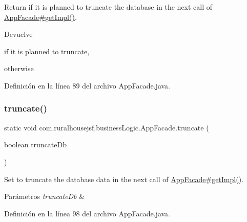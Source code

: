 Return if it is planned to truncate the database in the next call of \mbox{\hyperlink{classcom_1_1ruralhousejsf_1_1business_logic_1_1_app_facade_a029bcceee98b9070b9f80abc54db45d6}{App\+Facade\#get\+Impl()}}.

\begin{DoxyReturn}{Devuelve}

\begin{DoxyCode}{0}
\DoxyCodeLine{\textcolor{keyword}{true} }
\end{DoxyCode}
 if it is planned to truncate,
\begin{DoxyCode}{0}
\DoxyCodeLine{\textcolor{keyword}{false} }
\end{DoxyCode}
 otherwise 
\end{DoxyReturn}


Definición en la línea 89 del archivo App\+Facade.\+java.

\mbox{\label{classcom_1_1ruralhousejsf_1_1business_logic_1_1_app_facade_a98aed1ed8a03c6a92e15121fed4eb452}} 
\subsubsection{\texorpdfstring{truncate()}{truncate()}}
{\footnotesize\ttfamily static void com.\+ruralhousejsf.\+business\+Logic.\+App\+Facade.\+truncate (\begin{DoxyParamCaption}\item[{boolean}]{truncate\+Db }\end{DoxyParamCaption})\hspace{0.3cm}{\ttfamily [static]}}

Set to truncate the database data in the next call of \mbox{\hyperlink{classcom_1_1ruralhousejsf_1_1business_logic_1_1_app_facade_a029bcceee98b9070b9f80abc54db45d6}{App\+Facade\#get\+Impl()}}.


\begin{DoxyParams}{Parámetros}
{\em truncate\+Db} & \\
\hline
\end{DoxyParams}


Definición en la línea 98 del archivo App\+Facade.\+java.



